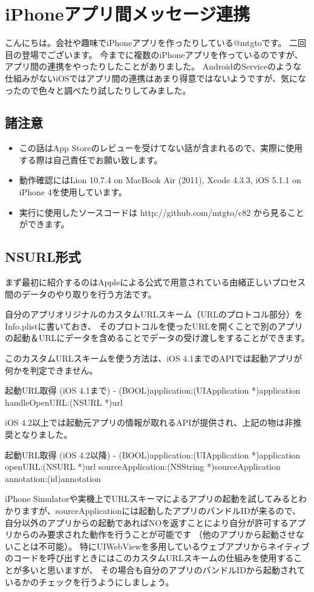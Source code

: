 \section{iPhoneアプリ間メッセージ連携}
こんにちは。会社や趣味でiPhoneアプリを作ったりしている@mtgtoです。
二回目の登場でございます。
今までに複数のiPhoneアプリを作っているのですが、アプリ間の連携をやったりしたことがありました。
AndroidのServiceのような仕組みがないiOSではアプリ間の連携はあまり得意ではないようですが、気になったので色々と調べたり試したりしてみました。

\subsection{諸注意}
\begin{itemize}
  \item この話はApp Storeのレビューを受けてない話が含まれるので、実際に使用する際は自己責任でお願い致します。
  \item 動作確認にはLion 10.7.4 on MacBook Air (2011), Xcode 4.3.3, iOS 5.1.1 on iPhone 4を使用しています。
  \item 実行に使用したソースコードは http://github.com/mtgto/c82 から見ることができます。
\end{itemize}
\subsection{NSURL形式}
まず最初に紹介するのはAppleによる公式で用意されている由緒正しいプロセス間のデータのやり取りを行う方法です。

自分のアプリオリジナルのカスタムURLスキーム（URLのプロトコル部分）をInfo.plistに書いておき、
そのプロトコルを使ったURLを開くことで別のアプリの起動＆URLにデータを含めることでデータの受け渡しをすることができます。

このカスタムURLスキームを使う方法は、iOS 4.1までのAPIでは起動アプリが何かを判定できません。
\begin{itembox}{起動URL取得 (iOS 4.1まで)}
- (BOOL)application:(UIApplication *)application handleOpenURL:(NSURL *)url
\end{itembox}
iOS 4.2以上では起動元アプリの情報が取れるAPIが提供され、上記の物は非推奨となりました。
\begin{itembox}{起動URL取得 (iOS 4.2以降)}
- (BOOL)application:(UIApplication *)application openURL:(NSURL *)url sourceApplication:(NSString *)sourceApplication annotation:(id)annotation
\end{itembox}
iPhone Simulatorや実機上でURLスキーマによるアプリの起動を試してみるとわかりますが、sourceApplicationには起動したアプリのバンドルIDが来るので、
自分以外のアプリからの起動であればNOを返すことにより自分が許可するアプリからのみ要求された動作を行うことが可能です
（他のアプリから起動させないことは不可能）。
特にUIWebViewを多用しているウェブアプリからネイティブのコードを呼び出すときにはこのカスタムURLスキームの仕組みを使用することが多いと思いますが、
その場合も自分のアプリのバンドルIDから起動されているかのチェックを行うようにしましょう。

